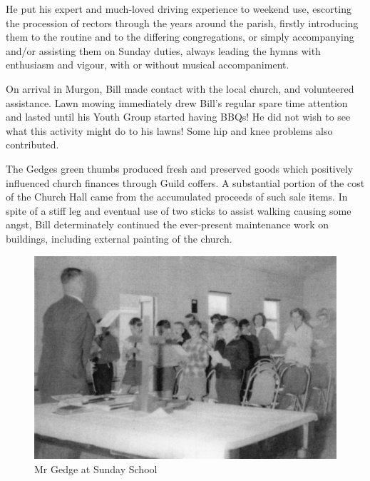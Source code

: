 He put his expert and much-loved driving experience to weekend use, escorting the procession of rectors through the years around the parish, firstly introducing them to the routine and to the differing congregations, or simply accompanying and/or assisting them on Sunday duties, always leading the hymns with enthusiasm and vigour, with or without musical accompaniment.



On arrival in Murgon, Bill made contact with the local church, and volunteered assistance. Lawn mowing immediately drew Bill's regular spare time attention and lasted until his Youth Group started having BBQs! He did not wish to see what this activity might do to his lawns! Some hip and knee problems also contributed.



The Gedges green thumbs produced fresh and preserved goods which positively influenced church finances through Guild coffers. A substantial portion of the cost of the Church Hall came from the accumulated proceeds of such sale items. In spite of a stiff leg and eventual use of two sticks to assist walking causing some angst, Bill determinately continued the ever-present maintenance work on buildings, including external painting of the church.









\begin{figure}
\begin{center}
\includegraphics[width=1.\linewidth,center]{../images/gedgeSundaySchool.jpg}
\caption{Mr Gedge at Sunday School}
\end{center}
\end{figure}




